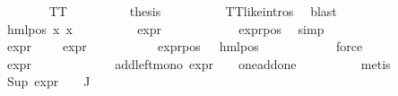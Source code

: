 \begin{isabellebody}
\ \ \ \ \ \ \isamarkupfalse%
\ TT\isanewline
\ \ \ \ \ \ \isamarkupfalse%
\ \isamarkupfalse%
\ {\isacharquery}{\kern0pt}thesis\isanewline
\ \ \ \ \ \ \ \ \isamarkupfalse%
\ TT{\isacharunderscore}{\kern0pt}like{\isachardot}{\kern0pt}intros{\isacharparenleft}{\kern0pt}{}{\isacharparenright}{\kern0pt}\ \isamarkupfalse%
\ blast\isanewline
\ \ \ \ \isamarkupfalse%
\isanewline
\ \ \ \ \ \ \isamarkupfalse%
\ {\isacharparenleft}{\kern0pt}hml{\isacharunderscore}{\kern0pt}pos\ x{}{}\ x{}{}{\isacharparenright}{\kern0pt}\isanewline
\ \ \ \ \ \ \isamarkupfalse%
\ {\isachardoublequoteopen}{}\ {\isasymle}\ expr{\isacharunderscore}{\kern0pt}{}\ {\isasymchi}\ {\isachardoublequoteclose}\isanewline
\ \ \ \ \ \ \ \ \isamarkupfalse%
\ expr{\isacharunderscore}{\kern0pt}{}{\isacharunderscore}{\kern0pt}pos\ \isamarkupfalse%
\ simp\isanewline
\ \ \ \ \ \ \isamarkupfalse%
\ {\isachardoublequoteopen}expr{\isacharunderscore}{\kern0pt}{}\ {\isasympsi}\ {\isacharequal}{\kern0pt}\ {}\ {\isacharplus}{\kern0pt}\ expr{\isacharunderscore}{\kern0pt}{}\ {\isasymchi}{\isachardoublequoteclose}\isanewline
\ \ \ \ \ \ \ \ \isamarkupfalse%
\ expr{\isacharunderscore}{\kern0pt}{}{\isacharunderscore}{\kern0pt}pos\ {\isacartoucheopen}{\isasympsi}\ {\isacharequal}{\kern0pt}\ hml{\isacharunderscore}{\kern0pt}pos\ {\isasymalpha}\ {\isasymchi}{\isacartoucheclose}\isanewline
\ \ \ \ \ \ \ \ \isamarkupfalse%
\ force\isanewline
\ \ \ \ \ \ \isamarkupfalse%
\ {\isachardoublequoteopen}expr{\isacharunderscore}{\kern0pt}{}\ {\isasympsi}\ {\isasymge}\ {}{\isachardoublequoteclose}\isanewline
\ \ \ \ \ \ \ \ \isamarkupfalse%
\ add{\isacharunderscore}{\kern0pt}left{\isacharunderscore}{\kern0pt}mono\ {\isacartoucheopen}expr{\isacharunderscore}{\kern0pt}{}\ {\isasymchi}\ {\isasymge}\ {}{\isacartoucheclose}\ one{\isacharunderscore}{\kern0pt}add{\isacharunderscore}{\kern0pt}one\isanewline
\ \ \ \ \ \ \ \ \isamarkupfalse%
\ metis\isanewline
\ \ \ \ \ \ \isamarkupfalse%
\ {\isachardoublequoteopen}Sup\ {\isacharparenleft}{\kern0pt}{\isacharparenleft}{\kern0pt}expr{\isacharunderscore}{\kern0pt}{}\ {\isasymcirc}\ {\isasymPhi}{\isacharparenright}{\kern0pt}\ {\isacharbackquote}{\kern0pt}\ J{\isacharparenright}{\kern0pt}\ {\isasymge}\ {}{\isachardoublequoteclose}\isanewline

\end{isabellebody}
